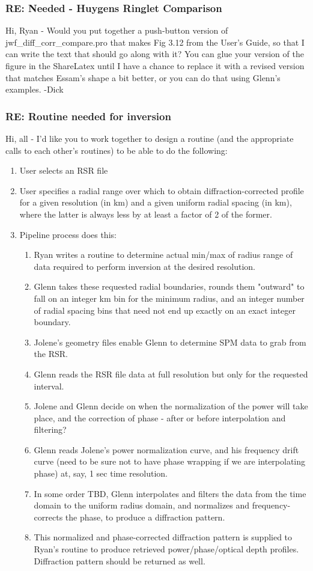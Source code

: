 \documentclass[crop=false,class=article,oneside]{standalone}
\begin{document}
\subsubsection{\footnotesize RE: Needed - Huygens Ringlet Comparison}
Hi, Ryan - Would you put together a push-button version of jwf\_diff\_corr\_compare.pro that makes Fig 3.12 from the User's Guide, so that I can write the text that should go along with it? You can glue your version of the figure in the ShareLatex until I have a chance to replace it with a revised version that matches Essam's shape a bit better, or you can do that using Glenn's examples. -Dick
\subsubsection{\footnotesize RE: Routine needed for inversion}
Hi, all - I'd like you to work together to design a routine (and the appropriate calls to each other's routines) to be able to do the following:
\begin{enumerate}
    \item User selects an RSR file
    \item User specifies a radial range over which to obtain diffraction-corrected profile for a given resolution (in km) and a given uniform radial spacing (in km), where the latter is always less by at least a factor of 2 of the former.
    \item Pipeline process does this:
    \begin{enumerate}
        \item Ryan writes a routine to determine actual min/max of radius range of data required to perform inversion at the desired resolution.
        \item Glenn takes these requested radial boundaries, rounds them "outward" to fall on an integer km bin for the minimum radius, and an integer number of radial spacing bins that need not end up exactly on an exact integer boundary.
        \item Jolene's geometry files enable Glenn to determine SPM data to grab from the RSR.
        \item Glenn reads the RSR file data at full resolution but only for the requested interval.
        \item Jolene and Glenn decide on when the normalization of the power will take place, and the correction of phase - after or before interpolation and filtering?
        \item Glenn reads Jolene's power normalization curve, and his frequency drift curve (need to be sure not to have phase wrapping if we are interpolating phase) at, say, 1 sec time resolution.
        \item In some order TBD, Glenn interpolates and filters the data from the time domain to the uniform radius domain, and normalizes and frequency-corrects the phase, to produce a diffraction pattern.
        \item This normalized and phase-corrected diffraction pattern is supplied to Ryan's routine to produce retrieved power/phase/optical depth profiles. Diffraction pattern should be returned as well.
    \end{enumerate}
\end{enumerate}
\end{document}
